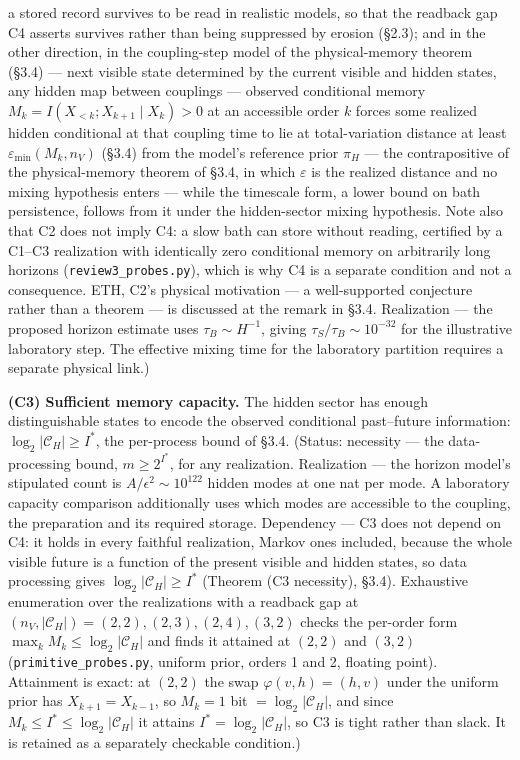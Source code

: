\documentclass[
]{article}
\begin{document}
a stored record survives to be read in realistic models, so that the
readback gap C4 asserts survives rather than being suppressed by erosion
(§2.3); and in the other direction, in the coupling-step model of the
physical-memory theorem (§3.4) --- next visible state determined by the
current visible and hidden states, any hidden map between couplings ---
observed conditional memory \(M_k = I(X_{<k}; X_{k+1} \mid X_k) > 0\) at
an accessible order \(k\) forces some realized hidden conditional at
that coupling time to lie at total-variation distance at least
\(\varepsilon_{\min}(M_k, n_V)\) (§3.4) from the model's reference prior
\(\pi_H\) --- the contrapositive of the physical-memory theorem of §3.4,
in which \(\varepsilon\) is the realized distance and no mixing
hypothesis enters --- while the timescale form, a lower bound on bath
persistence, follows from it under the hidden-sector mixing hypothesis.
Note also that C2 does not imply C4: a slow bath can store without
reading, certified by a C1--C3 realization with identically zero
conditional memory on arbitrarily long horizons
(\texttt{review3\_probes.py}), which is why C4 is a separate condition
and not a consequence. ETH, C2's physical motivation --- a
well-supported conjecture rather than a theorem --- is discussed at the
remark in §3.4. Realization --- the proposed horizon estimate uses
\(\tau_B\sim H^{-1}\), giving \(\tau_S/\tau_B\sim10^{-32}\) for the
illustrative laboratory step. The effective mixing time for the
laboratory partition requires a separate physical link.)

\textbf{(C3) Sufficient memory capacity.} The hidden sector has enough
distinguishable states to encode the observed conditional past--future
information: \(\log_2 |\mathcal{C}_H| \geq I^*\), the per-process bound
of §3.4. (Status: necessity --- the data-processing bound,
\(m \geq 2^{I^*}\), for any realization. Realization --- the horizon
model's stipulated count is \(A/\epsilon^2 \sim 10^{122}\) hidden modes
at one nat per mode. A laboratory capacity comparison additionally uses
which modes are accessible to the coupling, the preparation and its
required storage. Dependency --- C3 does not depend on C4: it holds in
every faithful realization, Markov ones included, because the whole
visible future is a function of the present visible and hidden states,
so data processing gives \(\log_2|\mathcal{C}_H| \geq I^*\) (Theorem (C3
necessity), §3.4). Exhaustive enumeration over the realizations with a
readback gap at \((n_V, |\mathcal{C}_H|) = (2,2), (2,3), (2,4), (3,2)\)
checks the per-order form \(\max_k M_k \leq \log_2|\mathcal{C}_H|\) and
finds it attained at \((2,2)\) and \((3,2)\)
(\texttt{primitive\_probes.py}, uniform prior, orders 1 and 2, floating
point). Attainment is exact: at \((2,2)\) the swap
\(\varphi(v,h)=(h,v)\) under the uniform prior has \(X_{k+1}=X_{k-1}\),
so \(M_k=1\) bit \(=\log_2|\mathcal{C}_H|\), and since
\(M_k\le I^*\le\log_2|\mathcal{C}_H|\) it attains
\(I^*=\log_2|\mathcal{C}_H|\), so C3 is tight rather than slack. It is
retained as a separately checkable condition.)
\end{document}
